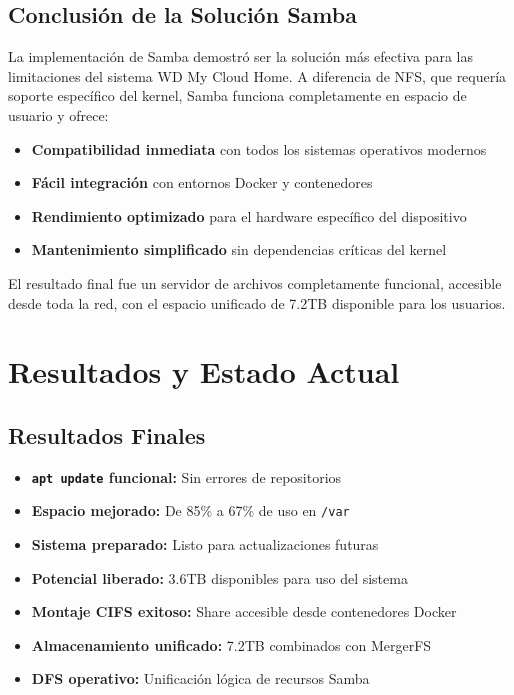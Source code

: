 \documentclass[12pt, a4paper]{article}
\begin{document}
\subsection{Conclusión de la Solución Samba}
\label{subsec:conclusion_samba}

La implementación de Samba demostró ser la solución más efectiva para las limitaciones del sistema WD My Cloud Home. A diferencia de NFS, que requería soporte específico del kernel, Samba funciona completamente en espacio de usuario y ofrece:

\begin{itemize}
    \item \textbf{Compatibilidad inmediata} con todos los sistemas operativos modernos
    \item \textbf{Fácil integración} con entornos Docker y contenedores
    \item \textbf{Rendimiento optimizado} para el hardware específico del dispositivo
    \item \textbf{Mantenimiento simplificado} sin dependencias críticas del kernel
\end{itemize}

El resultado final fue un servidor de archivos completamente funcional, accesible desde toda la red, con el espacio unificado de 7.2TB disponible para los usuarios.
\section{Resultados y Estado Actual}
\label{sec:resultados}

\subsection{Resultados Finales}
\label{subsec:resultados_finales}

\begin{itemize}
    \item \textbf{\texttt{apt update} funcional:} Sin errores de repositorios
    \item \textbf{Espacio mejorado:} De 85\% a 67\% de uso en \texttt{/var}
    \item \textbf{Sistema preparado:} Listo para actualizaciones futuras
    \item \textbf{Potencial liberado:} 3.6TB disponibles para uso del sistema
    \item \textbf{Montaje CIFS exitoso:} Share accesible desde contenedores Docker
    \item \textbf{Almacenamiento unificado:} 7.2TB combinados con MergerFS
    \item \textbf{DFS operativo:} Unificación lógica de recursos Samba
\end{itemize}
\end{document}
